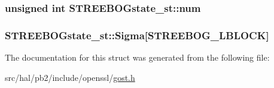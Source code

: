 \subsubsection[{\texorpdfstring{num}{num}}]{\setlength{\rightskip}{0pt plus 5cm}unsigned int S\+T\+R\+E\+E\+B\+O\+Gstate\+\_\+st\+::num}\hypertarget{struct_s_t_r_e_e_b_o_gstate__st_a9cbacab82088974fc38f3fe733311586}{}\label{struct_s_t_r_e_e_b_o_gstate__st_a9cbacab82088974fc38f3fe733311586}
\subsubsection[{\texorpdfstring{Sigma}{Sigma}}]{ S\+T\+R\+E\+E\+B\+O\+Gstate\+\_\+st\+::\+Sigma\mbox{[}{\bf S\+T\+R\+E\+E\+B\+O\+G\+\_\+\+L\+B\+L\+O\+CK}\mbox{]}}\hypertarget{struct_s_t_r_e_e_b_o_gstate__st_a077a86f03ca4910d5f7940d51b802749}{}\label{struct_s_t_r_e_e_b_o_gstate__st_a077a86f03ca4910d5f7940d51b802749}


The documentation for this struct was generated from the following file\+:\begin{DoxyCompactItemize}
\item 
src/hal/pb2/include/openssl/\hyperlink{gost_8h}{gost.\+h}\end{DoxyCompactItemize}
